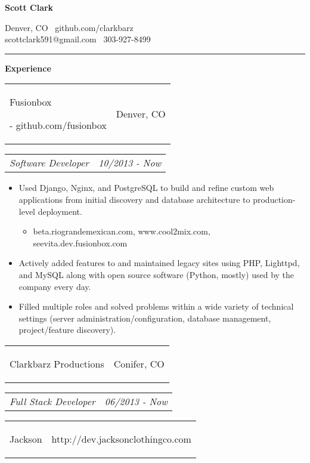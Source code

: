 \documentclass[11pt]{article}
\makeatletter
\newcommand{\headerrow}[2]
{\begin{tabular*}{\linewidth}{l@{\extracolsep{\fill}}r}
	#1 &
	#2 \\
\end{tabular*}}
\makeatother
\begin{document}
\begin{center}
	\begin{huge}
		\bf Scott Clark
	\end{huge}
	
	\large Denver, CO \textbullet\ github.com/clarkbarz \\
	\large scottclark591@gmail.com \textbullet\ 303-927-8499 \\
\end{center}

\vspace{-0.5em}
\hrule
\vspace{0.8em}

\begin{LARGE}
	\bf Experience
\end{LARGE}

\vspace{0.5em}
\headerrow
	{\begin{Large}Fusionbox\end{Large} - github.com/fusionbox}
	{Denver, CO}
\headerrow
	{\textit{Software Developer}}
	{\textit{10/2013 - Now}}
	
\vspace{-0.8em}
\begin{itemize}
	\item Used Django, Nginx, and PostgreSQL to build and refine custom web applications from initial discovery and database architecture to production-level deployment.
	\vspace{-0.6em}
	\begin{itemize}
		\item beta.riograndemexican.com, www.cool2mix.com, seevita.dev.fusionbox.com
	\end{itemize}
	\vspace{-1.0em}
	\item Actively added features to and maintained legacy sites using PHP, Lighttpd, and MySQL along with open source software (Python, mostly) used by the company every day. 
	\vspace{-0.6em}
	\item Filled multiple roles and solved problems within a wide variety of technical settings (server administration/configuration, database management, project/feature discovery).
\end{itemize}

\vspace{-0.3em}
\headerrow
	{\begin{Large}Clarkbarz Productions\end{Large}}
	{Conifer, CO}
\headerrow
	{\textit{Full Stack Developer}}
	{\textit{06/2013 - Now}}
\headerrow
	{\begin{bf}Jackson\end{bf}}
	{http://dev.jacksonclothingco.com}
\end{document}

